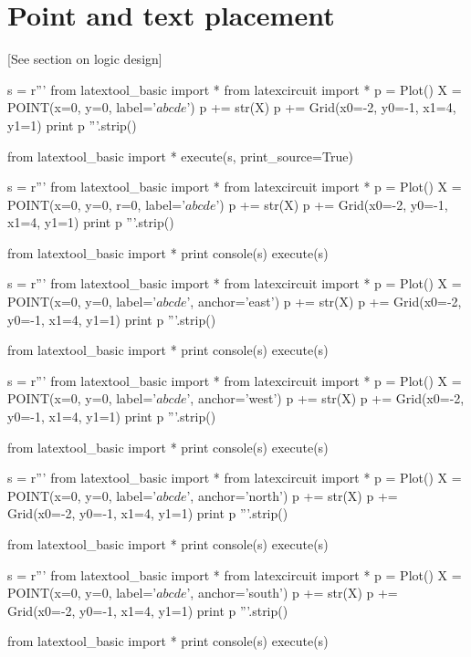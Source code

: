 \section{Point and text placement}

[See section on logic design]

\begin{python}
s = r'''
from latextool_basic import *
from latexcircuit import *
p = Plot()
X = POINT(x=0, y=0, label='$abcde$')
p += str(X)
p += Grid(x0=-2, y0=-1, x1=4, y1=1)
print p
'''.strip()

from latextool_basic import *
execute(s, print_source=True)
\end{python}

\newpage
\begin{python}
s = r'''
from latextool_basic import *
from latexcircuit import *
p = Plot()
X = POINT(x=0, y=0, r=0, label='$abcde$')
p += str(X)
p += Grid(x0=-2, y0=-1, x1=4, y1=1)
print p
'''.strip()

from latextool_basic import *
print console(s)
execute(s)
\end{python}

\begin{python}
s = r'''
from latextool_basic import *
from latexcircuit import *
p = Plot()
X = POINT(x=0, y=0, label='$abcde$', anchor='east')
p += str(X)
p += Grid(x0=-2, y0=-1, x1=4, y1=1)
print p
'''.strip()

from latextool_basic import *
print console(s)
execute(s)
\end{python}

\begin{python}
s = r'''
from latextool_basic import *
from latexcircuit import *
p = Plot()
X = POINT(x=0, y=0, label='$abcde$', anchor='west')
p += str(X)
p += Grid(x0=-2, y0=-1, x1=4, y1=1)
print p
'''.strip()

from latextool_basic import *
print console(s)
execute(s)
\end{python}

\begin{python}
s = r'''
from latextool_basic import *
from latexcircuit import *
p = Plot()
X = POINT(x=0, y=0, label='$abcde$', anchor='north')
p += str(X)
p += Grid(x0=-2, y0=-1, x1=4, y1=1)
print p
'''.strip()

from latextool_basic import *
print console(s)
execute(s)
\end{python}


\begin{python}
s = r'''
from latextool_basic import *
from latexcircuit import *
p = Plot()
X = POINT(x=0, y=0, label='$abcde$', anchor='south')
p += str(X)
p += Grid(x0=-2, y0=-1, x1=4, y1=1)
print p
'''.strip()

from latextool_basic import *
print console(s)
execute(s)
\end{python}

